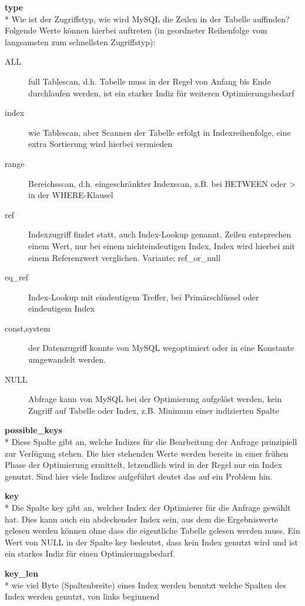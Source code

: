 \textbf{type}\\*
Wie ist der Zugriffstyp, wie wird MySQL die Zeilen in der Tabelle auffinden? Folgende Werte können hierbei auftreten (in geordneter Reihenfolge vom langsamsten zum schnellsten Zugriffstyp):
\begin{description}
\item[ALL] full Tablescan, d.h. Tabelle muss in der Regel von Anfang bis Ende durchlaufen werden, ist ein starker Indiz für weiteren Optimierungsbedarf
\item[index] wie Tablescan, aber Scannen der Tabelle erfolgt in Indexreihenfolge, eine extra Sortierung wird hierbei vermieden
\item[range] Bereichsscan, d.h. eingeschränkter Indexscan, z.B. bei BETWEEN oder > in der WHERE-Klausel
\item[ref] Indexzugriff findet statt, auch Index-Lookup genannt, Zeilen entsprechen einem Wert, nur bei einem nichteindeutigen Index, Index wird hierbei mit einem Referenzwert verglichen. Variante: ref\_or\_null
\item[eq\_ref] Index-Lookup mit eindeutigem Treffer, bei Primärschlüssel oder eindeutigem Index
\item[const,system] der Datenzugriff konnte von MySQL wegoptimiert oder in eine Konstante umgewandelt werden.
\item[NULL] Abfrage kann von MySQL bei der Optimierung aufgelöst werden, kein Zugriff auf Tabelle oder Index, z.B. Minimum einer indizierten Spalte
\end{description}

\textbf{possible\_keys}\\*
Diese Spalte gibt an, welche Indizes für die Bearbeitung der Anfrage prinzipiell zur Verfügung stehen.
Die hier stehenden Werte werden bereits in einer frühen Phase der Optimierung ermittelt, letzendlich wird in der Regel nur ein Index genutzt. Sind hier viele Indizes aufgeführt deutet das auf ein Problem hin.

\textbf{key}\\*
Die Spalte key gibt an, welcher Index der Optimierer für die Anfrage gewählt hat. Dies kann auch ein abdeckender Index sein, aus dem die Ergebniswerte gelesen werden können ohne dass die eigentliche Tabelle gelesen werden muss. Ein Wert von NULL in der Spalte key bedeutet, dass kein Index genutzt wird und ist ein starkes Indiz für einen Optimierungsbedarf.

\textbf{key\_len}\\*
wie viel Byte (Spaltenbreite) eines Index werden benutzt
welche Spalten des Index werden genutzt, von links beginnend

